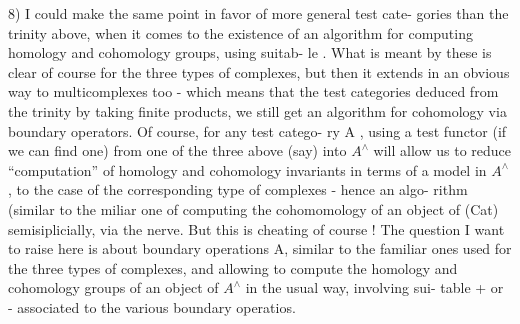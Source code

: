 8) I could make the same point in favor of more general test cate-%
gories than the trinity above, when it comes to the existence of an
algorithm for computing homology and cohomology groups, using suitab-%
le \hand{\uline{\textcolor{black}{boundary}}} \hand{\uline{\textcolor{black}{operators}}}. What is meant by these is clear of course for
the three types of complexes, but then it extends in an obvious way to
multicomplexes too - which means that  the test categories deduced
from the trinity by taking finite products, we still get an algorithm
for cohomology via boundary operators. Of course, for any test catego-%
ry A , using a test functor (if we can find one) from one of the
three above (say) into $A^{\wedge}$ will allow us to reduce ``computation'' of
homology and cohomology invariants in terms of a model in $A^{\wedge}$, to the
case of the corresponding type of complexes - hence  an algo-%
rithm (similar to the miliar one of computing the cohomomology of an
object of (Cat)  semisiplicially, via the nerve\hand{)}. But this is
cheating of course ! The question I want to raise here is about
 boundary operations  A, similar to the familiar ones used for
the three  types of complexes, and allowing to compute the homology and
cohomology groups of an object of $A^{\wedge}$ in the usual way, involving sui-%
table \hand{\uline{\textcolor{black}{signs}}} + or - associated to the various boundary operatios.

